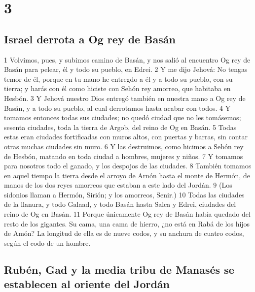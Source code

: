 \chapter{3}


\section{Israel derrota a Og rey de Basán}


1 Volvimos, pues, y subimos camino de Basán, y nos salió al encuentro Og rey de Basán para pelear, él y todo su pueblo, en Edrei.
2 Y me dijo Jehová: No tengas temor de él, porque en tu mano he entregdo a él y a todo su pueblo, con su tierra; y harás con él como hiciste con Sehón rey amorreo, que habitaba en Hesbón.
3 Y Jehová nuestro Dios entregó también en nuestra mano a Og rey de Basán, y a todo su pueblo, al cual derrotamos hasta acabar con todos.
4 Y tomamos entonces todas sus ciudades; no quedó ciudad que no les tomásemos; sesenta ciudades, toda la tierra de Argob, del reino de Og en Basán.
5 Todas estas eran ciudades fortificadas con muros altos, con puertas y barras, sin contar otras muchas ciudades sin muro.
6 Y las destruimos, como hicimos a Sehón rey de Hesbón, matando en toda ciudad a hombres, mujeres y niños.
7 Y tomamos para nosotros todo el ganado, y los despojos de las ciudades.
8 También tomamos en aquel tiempo la tierra desde el arroyo de Arnón hasta el monte de Hermón, de manos de los dos reyes amorreos que estaban a este lado del Jordán.
9 (Los sidonios llaman a Hermón, Sirión; y los amorreos, Senir.)
10 Todas las ciudades de la llanura, y todo Galaad, y todo Basán hasta Salca y Edrei, ciudades del reino de Og en Basán.
11 Porque únicamente Og rey de Basán había quedado del resto de los gigantes. Su cama, una cama de hierro, ¿no está en Rabá de los hijos de Amón? La longitud de ella es de nueve codos,  y su anchura de cuatro codos, según el codo de un hombre.
\section*{Rubén, Gad y la media tribu de Manasés se establecen al oriente del Jordán}


